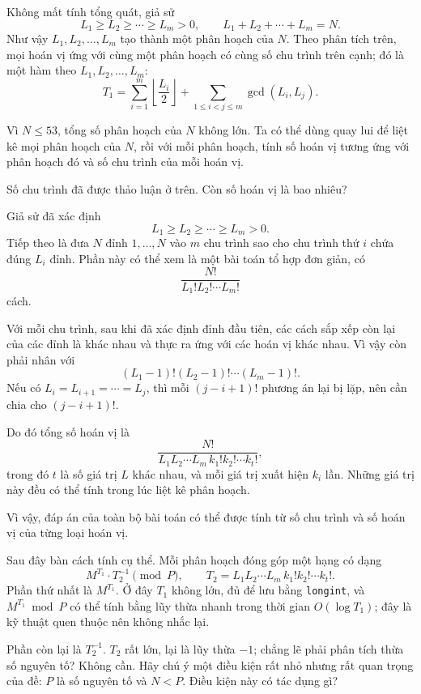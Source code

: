 \documentclass[11pt]{article}
\begin{document}
Không mất tính tổng quát, giả sử
\[
  L_1\ge L_2\ge\cdots\ge L_m>0,
  \qquad L_1+L_2+\cdots+L_m=N.
\]
Như vậy \(L_1,L_2,\ldots,L_m\) tạo thành một phân hoạch của \(N\). Theo phân
tích trên, mọi hoán vị ứng với cùng một phân hoạch có cùng số chu trình trên
cạnh; đó là một hàm theo \(L_1,L_2,\ldots,L_m\):
\[
  T_1=\sum_{i=1}^{m}\left\lfloor\frac{L_i}{2}\right\rfloor
      +\sum_{1\le i<j\le m}\gcd(L_i,L_j).
\]

Vì \(N\le 53\), tổng số phân hoạch của \(N\) không lớn. Ta có thể dùng quay
lui để liệt kê mọi phân hoạch của \(N\), rồi với mỗi phân hoạch, tính số hoán
vị tương ứng với phân hoạch đó và số chu trình của mỗi hoán vị.

Số chu trình đã được thảo luận ở trên. Còn số hoán vị là bao nhiêu?

Giả sử đã xác định
\[
  L_1\ge L_2\ge\cdots\ge L_m>0.
\]
Tiếp theo là đưa \(N\) đỉnh \(1,\ldots,N\) vào \(m\) chu trình sao cho chu
trình thứ \(i\) chứa đúng \(L_i\) đỉnh. Phần này có thể xem là một bài toán
tổ hợp đơn giản, có
\[
  \frac{N!}{L_1!L_2!\cdots L_m!}
\]
cách.

Với mỗi chu trình, sau khi đã xác định đỉnh đầu tiên, các cách sắp xếp còn
lại của các đỉnh là khác nhau và thực ra ứng với các hoán vị khác nhau. Vì
vậy còn phải nhân với
\[
  (L_1-1)!(L_2-1)!\cdots(L_m-1)!.
\]
Nếu có \(L_i=L_{i+1}=\cdots=L_j\), thì mỗi \((j-i+1)!\) phương án lại bị lặp,
nên cần chia cho \((j-i+1)!\).

Do đó tổng số hoán vị là
\[
  \frac{N!}{L_1L_2\cdots L_m\, k_1!k_2!\cdots k_t!},
\]
trong đó \(t\) là số giá trị \(L\) khác nhau, và mỗi giá trị xuất hiện \(k_i\)
lần. Những giá trị này đều có thể tính trong lúc liệt kê phân hoạch.

Vì vậy, đáp án của toàn bộ bài toán có thể được tính từ số chu trình và số
hoán vị của từng loại hoán vị.

Sau đây bàn cách tính cụ thể. Mỗi phân hoạch đóng góp một hạng có dạng
\[
  M^{T_1}\cdot T_2^{-1}\pmod P,
  \qquad
  T_2=L_1L_2\cdots L_m\, k_1!k_2!\cdots k_t!.
\]
Phần thứ nhất là \(M^{T_1}\). Ở đây \(T_1\) không lớn, đủ để lưu bằng
\texttt{longint}, và \(M^{T_1}\bmod P\) có thể tính bằng lũy thừa nhanh trong
thời gian \(O(\log T_1)\); đây là kỹ thuật quen thuộc nên không nhắc lại.

Phần còn lại là \(T_2^{-1}\). \(T_2\) rất lớn, lại là lũy thừa \(-1\); chẳng
lẽ phải phân tích thừa số nguyên tố? Không cần. Hãy chú ý một điều kiện rất
nhỏ nhưng rất quan trọng của đề: \(P\) là số nguyên tố và \(N<P\). Điều kiện
này có tác dụng gì?
\end{document}
